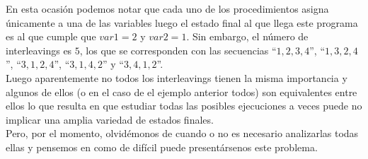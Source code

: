 En esta ocasión podemos notar que cada uno de los procedimientos asigna únicamente a una de las variables luego el estado final al que llega este programa es al que cumple que $var1 = 2$ y $var2 = 1$. Sin embargo, el número de interleavings es $5$, los que se corresponden con las secuencias ``$1, 2, 3, 4$'', ``$1, 3, 2, 4$'', ``$3, 1, 2, 4$'', ``$3, 1, 4, 2$'' y ``$3, 4, 1, 2$''.\\

Luego aparentemente no todos los interleavings tienen la misma importancia y algunos de ellos (o en el caso de el ejemplo anterior todos) son equivalentes entre ellos lo que resulta en que estudiar todas las posibles ejecuciones a veces puede no implicar una amplia variedad de estados finales.\\

Pero, por el momento, olvidémonos de cuando o no es necesario analizarlas todas ellas y pensemos en como de difícil puede presentársenos este problema.\\
